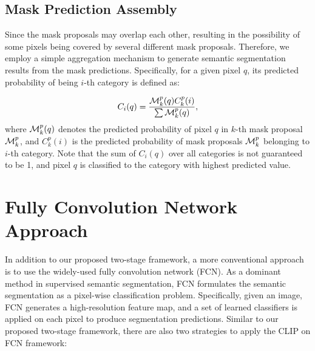 \documentclass[runningheads]{llncs}
\begin{document}
\subsection{Mask Prediction Assembly}
\label{sec:mask_prediction_assembly}
Since the mask proposals may overlap each other, resulting in the possibility of some pixels being covered by several different mask proposals. Therefore, we employ a simple aggregation mechanism to generate semantic segmentation results from the mask predictions. Specifically, for a given pixel $q$, its predicted probability of being $i$-th category is defined as:

\begin{equation}
\small
    C_i(q) = \frac{{\cal M}_{k}^{p}(q) {C}_{k}^p(i)}{\sum{{\cal M}_{k}^{p}(q)}},
\end{equation}
where ${\cal M}_{k}^{p}(q)$ denotes the predicted probability of pixel $q$ in $k$-th mask proposal ${\cal M}_{k}^{p}$, and ${C}_{k}^p(i)$ is the predicted probability of mask proposals ${\cal M}_{k}^{p}$ belonging to $i$-th category. Note that the sum of $C_i(q)$ over all categories is not guaranteed to be 1, and pixel $q$ is classified to the category with highest predicted value.

\section{Fully Convolution Network Approach}
In addition to our proposed two-stage framework, a more conventional approach is to use the widely-used fully convolution network (FCN). As a dominant method in supervised semantic segmentation, FCN formulates the semantic segmentation as a pixel-wise classification problem. Specifically, given an image, FCN generates a high-resolution feature map, and a set of learned classifiers is applied on each pixel to produce segmentation predictions. Similar to our proposed two-stage framework, there are also two strategies to apply the CLIP on FCN framework:
\end{document}
